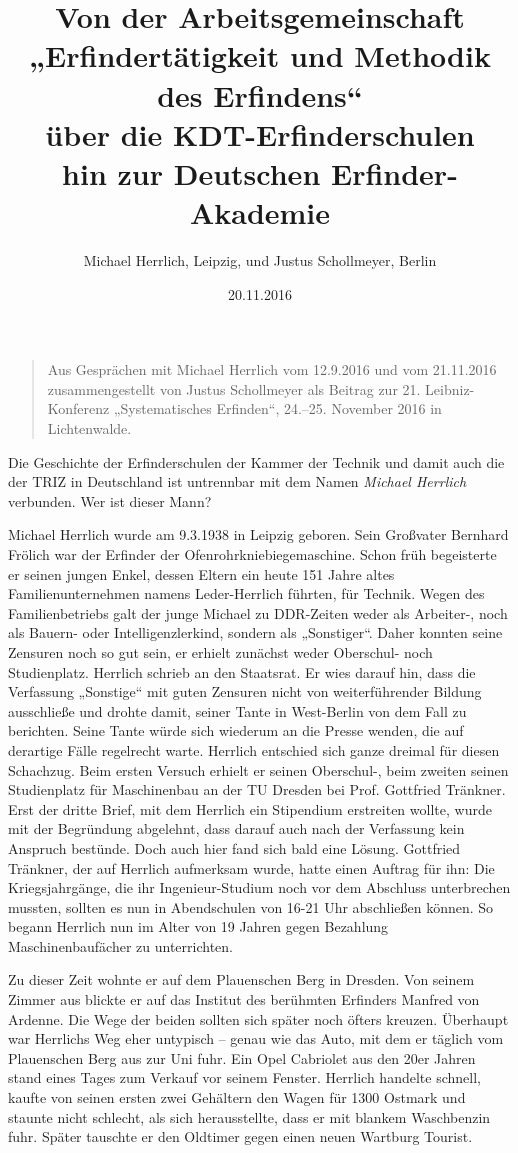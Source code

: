 \documentclass[11pt,a4paper]{article}
\title{Von der Arbeitsgemeinschaft\\ „Erfindertätigkeit und Methodik des
  Erfindens“\\ über die KDT-Erfinderschulen\\ hin zur Deutschen
  Erfinder-Akademie}
\author{Michael Herrlich, Leipzig, und Justus Schollmeyer, Berlin}
\date{20.11.2016}
\begin{document}
\maketitle
\begin{quote}
  Aus Gesprächen mit Michael Herrlich vom 12.9.2016 und vom 21.11.2016
  zusammengestellt von Justus Schollmeyer als Beitrag zur
  21. Leibniz-Konferenz „Systematisches Erfinden“, 24.--25. November 2016 in
  Lichtenwalde.
\end{quote}

Die Geschichte der Erfinderschulen der Kammer der Technik und damit auch die
der TRIZ in Deutschland ist untrennbar mit dem Namen \emph{Michael Herrlich}
verbunden.  Wer ist dieser Mann?

Michael Herrlich wurde am 9.3.1938 in Leipzig geboren. Sein Großvater Bernhard
Frölich war der Erfinder der Ofenrohrkniebiegemaschine. Schon früh begeisterte
er seinen jungen Enkel, dessen Eltern ein heute 151 Jahre altes
Familienunternehmen namens Leder-Herrlich führten, für Technik. Wegen des
Familienbetriebs galt der junge Michael zu DDR-Zeiten weder als Arbeiter-,
noch als Bauern- oder Intelligenzlerkind, sondern als „Sonstiger“. Daher
konnten seine Zensuren noch so gut sein, er erhielt zunächst weder Oberschul-
noch Studienplatz. Herrlich schrieb an den Staatsrat. Er wies darauf hin, dass
die Verfassung „Sonstige“ mit guten Zensuren nicht von weiterführender Bildung
ausschließe und drohte damit, seiner Tante in West-Berlin von dem Fall zu
berichten.  Seine Tante würde sich wiederum an die Presse wenden, die auf
derartige Fälle regelrecht warte. Herrlich entschied sich ganze dreimal für
diesen Schachzug. Beim ersten Versuch erhielt er seinen Oberschul-, beim
zweiten seinen Studienplatz für Maschinenbau an der TU Dresden bei
Prof. Gottfried Tränkner. Erst der dritte Brief, mit dem Herrlich ein
Stipendium erstreiten wollte, wurde mit der Begründung abgelehnt, dass darauf
auch nach der Verfassung kein Anspruch bestünde. Doch auch hier fand sich bald
eine Lösung. Gottfried Tränkner, der auf Herrlich aufmerksam wurde, hatte
einen Auftrag für ihn: Die Kriegsjahrgänge, die ihr Ingenieur-Studium noch vor
dem Abschluss unterbrechen mussten, sollten es nun in Abendschulen von 16-21
Uhr abschließen können. So begann Herrlich nun im Alter von 19 Jahren gegen
Bezahlung Maschinenbaufächer zu unterrichten.

Zu dieser Zeit wohnte er auf dem Plauenschen Berg in Dresden. Von seinem
Zimmer aus blickte er auf das Institut des berühmten Erfinders Manfred von
Ardenne. Die Wege der beiden sollten sich später noch öfters kreuzen.
Überhaupt war Herrlichs Weg eher untypisch – genau wie das Auto, mit dem er
täglich vom Plauenschen Berg aus zur Uni fuhr. Ein Opel Cabriolet aus den 20er
Jahren stand eines Tages zum Verkauf vor seinem Fenster. Herrlich handelte
schnell, kaufte von seinen ersten zwei Gehältern den Wagen für 1300 Ostmark
und staunte nicht schlecht, als sich herausstellte, dass er mit blankem
Waschbenzin fuhr. Später tauschte er den Oldtimer gegen einen neuen Wartburg
Tourist.
\end{document}
